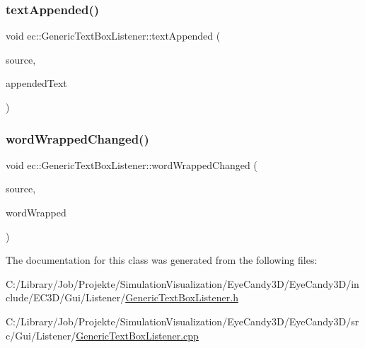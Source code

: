 \subsubsection{\texorpdfstring{text\+Appended()}{textAppended()}}
{\footnotesize\ttfamily void ec\+::\+Generic\+Text\+Box\+Listener\+::text\+Appended (\begin{DoxyParamCaption}\item[{agui\+::\+Text\+Box $\ast$}]{source,  }\item[{const std\+::string \&}]{appended\+Text }\end{DoxyParamCaption})\hspace{0.3cm}{\ttfamily [override]}}

\mbox{\label{classec_1_1_generic_text_box_listener_a96cdc8f0e3932f1cfbe2fd6888818452}} 
\subsubsection{\texorpdfstring{word\+Wrapped\+Changed()}{wordWrappedChanged()}}
{\footnotesize\ttfamily void ec\+::\+Generic\+Text\+Box\+Listener\+::word\+Wrapped\+Changed (\begin{DoxyParamCaption}\item[{agui\+::\+Text\+Box $\ast$}]{source,  }\item[{bool}]{word\+Wrapped }\end{DoxyParamCaption})\hspace{0.3cm}{\ttfamily [override]}}



The documentation for this class was generated from the following files\+:\begin{DoxyCompactItemize}
\item 
C\+:/\+Library/\+Job/\+Projekte/\+Simulation\+Visualization/\+Eye\+Candy3\+D/\+Eye\+Candy3\+D/include/\+E\+C3\+D/\+Gui/\+Listener/\mbox{\hyperlink{_generic_text_box_listener_8h}{Generic\+Text\+Box\+Listener.\+h}}\item 
C\+:/\+Library/\+Job/\+Projekte/\+Simulation\+Visualization/\+Eye\+Candy3\+D/\+Eye\+Candy3\+D/src/\+Gui/\+Listener/\mbox{\hyperlink{_generic_text_box_listener_8cpp}{Generic\+Text\+Box\+Listener.\+cpp}}\end{DoxyCompactItemize}

